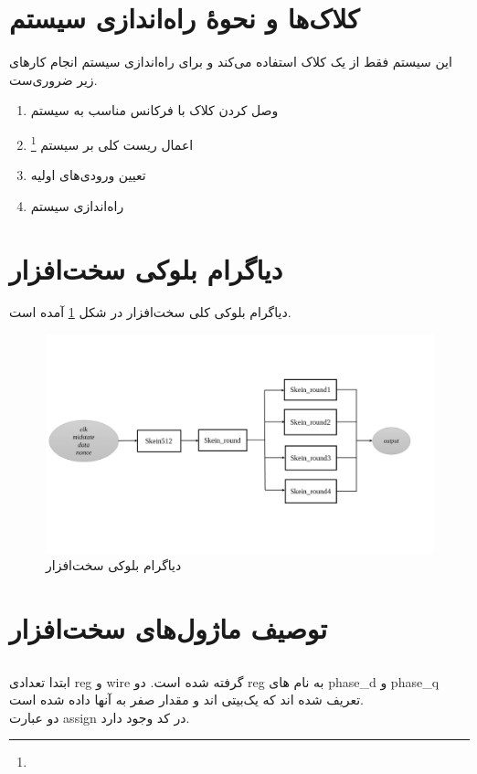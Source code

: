 \section{کلاک‌ها و نحوهٔ راه‌اندازی سیستم}
این سیستم فقط از یک کلاک استفاده می‌کند و برای راه‌اندازی سیستم انجام کارهای زیر ضروری‌ست.
\begin{enumerate}
	\item
	      وصل کردن کلاک با فرکانس مناسب به سیستم
	\item
	      اعمال ریست‌ کلی بر سیستم
	      \footnote{}
	\item 
	      تعیین ورودی‌های اولیه 
	\item 
	      راه‌اندازی سیستم 
\end{enumerate}


\section{دیاگرام بلوکی سخت‌افزار}
دیاگرام بلوکی کلی سخت‌افزار در شکل 
\ref{block_diagram}
آمده است. 

\begin{figure}
	\includegraphics[width = \textwidth]{figs/DescriptionOfSystem/block_diagram.jpg}
	\caption{دیاگرام بلوکی سخت‌افزار}
	\label{block_diagram}
\end{figure}

\section{توصیف ماژول‌های سخت‌افزار}
\subsection{}
ابتدا تعدادی reg و wire گرفته شده است.
دو reg به نام های phase\_d و phase\_q تعریف شده اند که یک‌بیتی اند و مقدار صفر به آنها داده شده است.\\
دو عبارت assign در کد وجود دارد.

